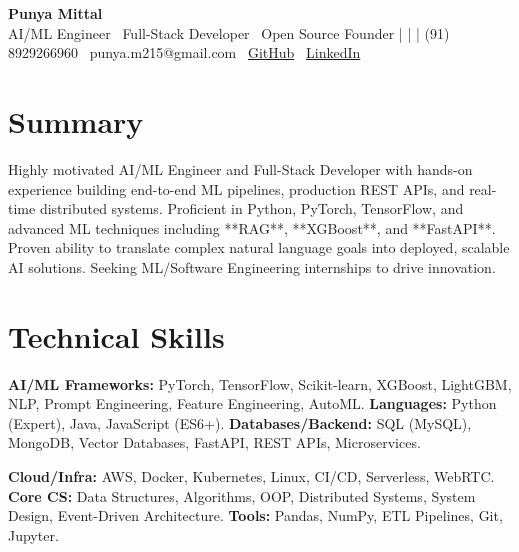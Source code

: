 \documentclass[10pt, letterpaper]{article}
\begin{document}
\begin{center}
    {\Huge \textbf{Punya Mittal}} \\
    \vspace{2pt}
    \small AI/ML Engineer \textperiodcentered\ Full-Stack Developer \textperiodcentered\ Open Source Founder
    \vspace{4pt}
    \small
    \faPhone | \faEnvelope | \faGithub | \faLinkedin
    \vspace{2pt}
    \small
    (91) 8929266960 \textperiodcentered\ punya.m215@gmail.com \textperiodcentered\ \href{https://github.com/yourusername}{GitHub} \textperiodcentered\ \href{https://linkedin.com/in/yourprofile}{LinkedIn}
\end{center}

\section*{Summary}
Highly motivated AI/ML Engineer and Full-Stack Developer with hands-on experience building end-to-end ML pipelines, production REST APIs, and real-time distributed systems. Proficient in Python, PyTorch, TensorFlow, and advanced ML techniques including **RAG**, **XGBoost**, and **FastAPI**. Proven ability to translate complex natural language goals into deployed, scalable AI solutions. Seeking ML/Software Engineering internships to drive innovation.

\section*{Technical Skills}
\begin{minipage}[t]{0.48\textwidth}
    \textbf{AI/ML Frameworks:} PyTorch, TensorFlow, Scikit-learn, XGBoost, LightGBM, NLP, Prompt Engineering, Feature Engineering, AutoML.
    \vspace{3pt}
    \textbf{Languages:} Python (Expert), Java, JavaScript (ES6+).
    \vspace{3pt}
    \textbf{Databases/Backend:} SQL (MySQL), MongoDB, Vector Databases, FastAPI, REST APIs, Microservices.
\end{minipage}
\hfill
\begin{minipage}[t]{0.48\textwidth}
    \textbf{Cloud/Infra:} AWS, Docker, Kubernetes, Linux, CI/CD, Serverless, WebRTC.
    \vspace{3pt}
    \textbf{Core CS:} Data Structures, Algorithms, OOP, Distributed Systems, System Design, Event-Driven Architecture.
    \vspace{3pt}
    \textbf{Tools:} Pandas, NumPy, ETL Pipelines, Git, Jupyter.
\end{minipage}
\end{document}

